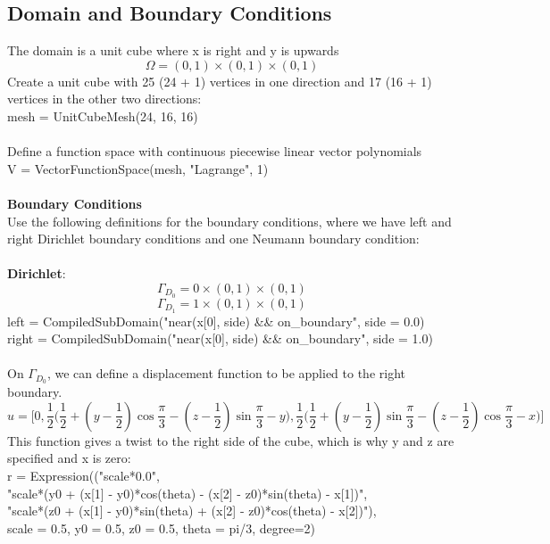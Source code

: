 \documentclass[12pt,3p]{article}
\begin{document}
\subsection{Domain and Boundary Conditions}
The domain is a unit cube where x is right and y is upwards
\[ \Omega = (0,1) \times (0,1) \times (0,1)\] 
Create a unit cube with 25 (24 + 1) vertices in one direction and 17 (16 + 1) vertices in the other two directions: \\
{\selectfont
mesh = UnitCubeMesh(24, 16, 16) \\ \\
}
Define a function space with continuous piecewise linear vector polynomials \\ 
{\selectfont
V = VectorFunctionSpace(mesh, "Lagrange", 1) \\ \\
}
\textbf{Boundary Conditions} \\
Use the following definitions for the boundary conditions, where we have left and right Dirichlet boundary conditions and one Neumann boundary condition: \\ \\
\textbf{Dirichlet}:
\[ \Gamma_{D_0} = 0 \times (0,1) \times (0,1) \]
\[ \Gamma_{D_1} = 1 \times (0,1) \times (0,1) \]
{\selectfont
left =  CompiledSubDomain("near(x[0], side) \&\& on\_boundary", side = 0.0) \\
right = CompiledSubDomain("near(x[0], side) \&\& on\_boundary", side = 1.0) \\ \\
}
On $\Gamma_{D_0}$, we can define a displacement function to be applied to the right boundary.
\[ u = \bigg[ 0, \frac{1}{2} \bigg(\frac{1}{2} + (y-\frac{1}{2}) \cos \frac{\pi}{3} - (z-\frac{1}{2}) \sin \frac{\pi}{3} - y \bigg), \frac{1}{2} \bigg( \frac{1}{2} + (y-\frac{1}{2}) \sin \frac{\pi}{3} - (z-\frac{1}{2}) \cos \frac{\pi}{3} - x \bigg) \bigg] \]
This function gives a twist to the right side of the cube, which is why y and z are specified and x is zero: \\
{\selectfont
r = Expression(("scale*0.0", \\ 
\indent "scale*(y0 + (x[1] - y0)*cos(theta) - (x[2] - z0)*sin(theta) - x[1])", \\
\indent "scale*(z0 + (x[1] - y0)*sin(theta) + (x[2] - z0)*cos(theta) - x[2])"), \\ 
\indent scale = 0.5, y0 = 0.5, z0 = 0.5, theta = pi/3, degree=2) \\ \\
}
\end{document}
